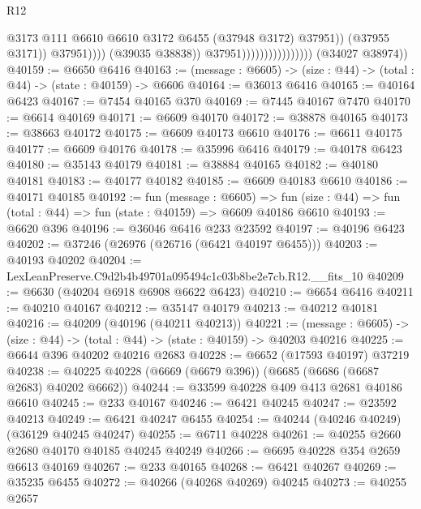 \begin{lexlean}{R12}
\begin{coremodule}
                                                      @3173
                                                      @111
                                                      @6610
                                                      @6610
                                                      @3172
                                                      @6455
                                                      (@37948 @3172)
                                                      @37951))
                                                  (@37955 @3171))
                                                @37951))))
                                        (@39035 @38838))
                                      @37951))))))))))))))))
      (@34027 @38974))
@40159 := @6650 @6416
@40163 := (message : @6605) -> (size : @44) -> (total : @44) -> (state : @40159) -> @6606
@40164 := @36013 @6416
@40165 := @40164 @6423
@40167 := @7454 @40165 @370
@40169 := @7445 @40167 @7470
@40170 := @6614 @40169
@40171 := @6609 @40170
@40172 := @38878 @40165
@40173 := @38663 @40172
@40175 := @6609 @40173 @6610
@40176 := @6611 @40175
@40177 := @6609 @40176
@40178 := @35996 @6416
@40179 := @40178 @6423
@40180 := @35143 @40179
@40181 := @38884 @40165
@40182 := @40180 @40181
@40183 := @40177 @40182
@40185 := @6609 @40183 @6610
@40186 := @40171 @40185
@40192 := fun (message : @6605) =>
  fun (size : @44) => fun (total : @44) => fun (state : @40159) => @6609 @40186 @6610
@40193 := @6620 @396
@40196 := @36046 @6416 @233 @23592
@40197 := @40196 @6423
@40202 := @37246 (@26976 (@26716 (@6421 @40197 @6455)))
@40203 := @40193 @40202
@40204 := LexLeanPreserve.C9d2b4b49701a095494c1c03b8be2e7cb.R12.__fits_10
@40209 := @6630 (@40204 @6918 @6908 @6622 @6423)
@40210 := @6654 @6416
@40211 := @40210 @40167
@40212 := @35147 @40179
@40213 := @40212 @40181
@40216 := @40209 (@40196 (@40211 @40213))
@40221 := (message : @6605) -> (size : @44) -> (total : @44) -> (state : @40159) -> @40203 @40216
@40225 := @6644 @396 @40202 @40216 @2683
@40228 := @6652 (@17593 @40197) @37219
@40238 := @40225 @40228 (@6669 (@6679 @396)) (@6685 (@6686 (@6687 @2683) @40202 @6662))
@40244 := @33599 @40228 @409 @413 @2681 @40186 @6610
@40245 := @233 @40167
@40246 := @6421 @40245
@40247 := @23592 @40213
@40249 := @6421 @40247 @6455
@40254 := @40244 (@40246 @40249) (@36129 @40245 @40247)
@40255 := @6711 @40228
@40261 := @40255 @2660 @2680 @40170 @40185 @40245 @40249
@40266 := @6695 @40228 @354 @2659 @6613 @40169
@40267 := @233 @40165
@40268 := @6421 @40267
@40269 := @35235 @6455
@40272 := @40266 (@40268 @40269) @40245
@40273 := @40255 @2657

\end{coremodule}
\end{lexlean}
